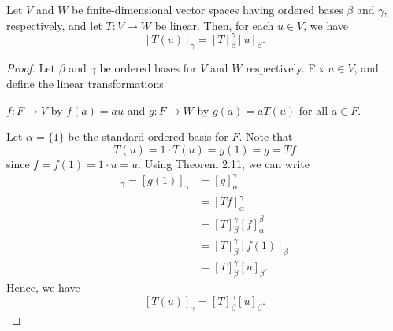\begin{theorem}\label{Theorem 2.14}
    Let \( V  \) and \( W  \) be finite-dimensional vector spaces having ordered bases \( \beta  \) and \( \gamma  \), respectively, and let \( T: V \to W  \) be linear. Then, for each \( u \in V  \), we have
    \[  [T(u)]_{\gamma}^{}  = [T]_{\beta}^{\gamma}  [u]_{\beta}^{}. \]
\end{theorem}
\begin{proof}
    Let \( \beta \) and \( \gamma \) be ordered bases for \( V  \) and \( W  \) respectively. Fix \( u \in V  \), and define the linear transformations 
    \begin{center}
        \( f: F \to V  \) by \( f(a) = au  \) and \( g: F \to W  \) by \( g(a) = aT(u) \) for all \( a \in F  \). 
    \end{center}
    Let \( \alpha = \{  1  \}  \) be the standard ordered basis for \( F  \). Note that 
    \[  T(u) = 1 \cdot T(u) = g(1) = g = Tf  \]
    since \( f = f(1)  = 1 \cdot u = u\). Using Theorem 2.11, we can write
    \begin{align*}
        [T(u)]_{\gamma}  = [g(1)]_{\gamma} &= [g]_{\alpha}^{\gamma}  \\
                                                 &= [Tf]_{\alpha}^{\gamma} \\
                                                 &= [T]_{\beta}^{\gamma} [f]_{\alpha}^{\beta} \\
                                                 &= [T]_{\beta}^{\gamma}  [f(1)]_{\beta}  \\
                                                 &= [T]_{\beta}^{\gamma}  [u]_{\beta}.
    \end{align*}
    Hence, we have
    \[  [T(u)]_{\gamma} = [T]_{\beta}^{\gamma}  [u]_{\beta}. \]
\end{proof}

